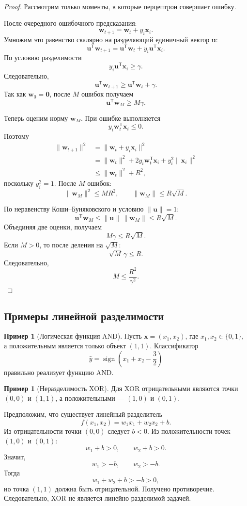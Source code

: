 \documentclass[12pt,a4paper]{article}
\theoremstyle{definition}
\newtheorem{example}[theorem]{Пример}
\newcommand{\T}{\mathsf{T}}
\newcommand{\1}{\mathbf{1}}
\DeclareMathOperator{\sign}{sign}
\begin{document}
\begin{proof}
Рассмотрим только моменты, в которые перцептрон совершает ошибку.

После очередного ошибочного предсказания:
\[
    \bm{w}_{t+1}
    =
    \bm{w}_t+y_i\bm{x}_i.
\]
Умножим это равенство скалярно на разделяющий единичный вектор
$\bm{u}$:
\[
    \bm{u}^{\T}\bm{w}_{t+1}
    =
    \bm{u}^{\T}\bm{w}_t
    +
    y_i\bm{u}^{\T}\bm{x}_i.
\]
По условию разделимости
\[
    y_i\bm{u}^{\T}\bm{x}_i\geq\gamma.
\]
Следовательно,
\[
    \bm{u}^{\T}\bm{w}_{t+1}
    \geq
    \bm{u}^{\T}\bm{w}_t+\gamma.
\]
Так как $\bm{w}_0=\bm{0}$, после $M$ ошибок получаем
\[
    \bm{u}^{\T}\bm{w}_M\geq M\gamma.
\]

Теперь оценим норму $\bm{w}_M$. При ошибке выполняется
\[
    y_i\bm{w}_t^{\T}\bm{x}_i\leq 0.
\]
Поэтому
\begin{align*}
    \|\bm{w}_{t+1}\|^2
    &=
    \|\bm{w}_t+y_i\bm{x}_i\|^2\\
    &=
    \|\bm{w}_t\|^2
    +
    2y_i\bm{w}_t^{\T}\bm{x}_i
    +
    y_i^2\|\bm{x}_i\|^2\\
    &\leq
    \|\bm{w}_t\|^2+R^2,
\end{align*}
поскольку $y_i^2=1$. После $M$ ошибок:
\[
    \|\bm{w}_M\|^2\leq MR^2,
    \qquad
    \|\bm{w}_M\|\leq R\sqrt{M}.
\]

По неравенству Коши--Буняковского и условию $\|\bm{u}\|=1$:
\[
    \bm{u}^{\T}\bm{w}_M
    \leq
    \|\bm{u}\|\,\|\bm{w}_M\|
    \leq
    R\sqrt{M}.
\]
Объединяя две оценки, получаем
\[
    M\gamma
    \leq
    R\sqrt{M}.
\]
Если $M>0$, то после деления на $\sqrt{M}$:
\[
    \sqrt{M}\,\gamma\leq R.
\]
Следовательно,
\[
    M\leq\frac{R^2}{\gamma^2}.
\]
\end{proof}

\subsection{Примеры линейной разделимости}

\begin{example}[Логическая функция AND]
Пусть $\bm{x}=(x_1,x_2)$, где $x_1,x_2\in\{0,1\}$, а положительным
является только объект $(1,1)$. Классификатор
\[
    \widehat{y}
    =
    \sign\left(x_1+x_2-\frac{3}{2}\right)
\]
правильно реализует функцию AND.
\end{example}

\begin{example}[Неразделимость XOR]
Для XOR отрицательными являются точки $(0,0)$ и $(1,1)$,
а положительными --- $(1,0)$ и $(0,1)$.

Предположим, что существует линейный разделитель
\[
    f(x_1,x_2)=w_1x_1+w_2x_2+b.
\]
Из отрицательности точки $(0,0)$ следует $b<0$. Из положительности
точек $(1,0)$ и $(0,1)$:
\[
    w_1+b>0,
    \qquad
    w_2+b>0.
\]
Значит,
\[
    w_1>-b,
    \qquad
    w_2>-b.
\]
Тогда
\[
    w_1+w_2+b>-b>0,
\]
но точка $(1,1)$ должна быть отрицательной. Получено противоречие.
Следовательно, XOR не является линейно разделимой задачей.
\end{example}
\end{document}
